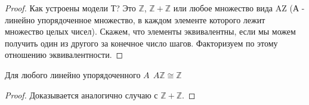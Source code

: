 \documentclass{article}
\begin{document}
\begin{proof}
Как устроены модели Т? Это \(\mathbb{Z}\), \(\mathbb{Z}+\mathbb{Z}\) или любое множество вида AZ (А - линейно упорядоченное множество, в каждом элементе которого лежит множество целых чисел).
Скажем, что элементы эквивалентны, если мы можем получить один из другого за конечное число шагов. Факторизуем по этому отношению эквивалентности.
\end{proof}

\begin{lemma}Для любого линейно упорядоченного \(A \: \: A  \mathbb{Z} \cong  \mathbb{Z}\)
\begin{proof}
Доказывается аналогично случаю с \(\mathbb{Z}+\mathbb{Z}\).
\end{proof}
\end{lemma}
\end{document}
